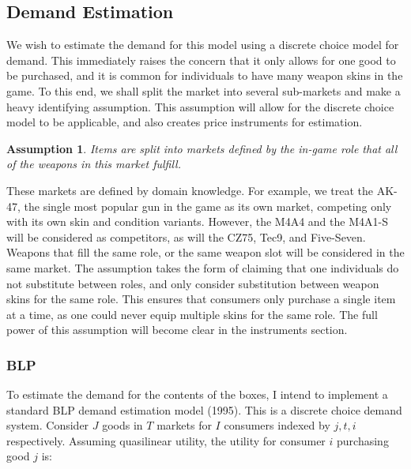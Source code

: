 \documentclass[12pt]{paper}
\newtheorem{assume}{Assumption}
\begin{document}

 \subsection{Demand Estimation}

We wish to estimate the demand for this model using a discrete choice
model for demand. This immediately raises the concern that it only
allows for one good to be purchased, and it is common for individuals
to have many weapon skins in the game. To this end, we shall split the
market into several sub-markets and make a heavy identifying
assumption. This assumption will allow for the discrete choice model
to be applicable, and also creates price instruments for estimation.

\begin{assume}
  Items are split into markets defined by the in-game role that all of
  the weapons in this market fulfill.
\end{assume}

These markets are defined by domain knowledge. For example, we treat
the AK-47, the single most popular gun in the game as its own market,
competing only with its own skin and condition variants. However, the
M4A4 and the M4A1-S will be considered as competitors, as will the
CZ75, Tec9, and Five-Seven. Weapons that fill the same role, or the
same weapon slot will be considered in the same market. The assumption
takes the form of claiming that one individuals do not substitute
between roles, and only consider substitution between weapon skins for
the same role. This ensures that consumers only purchase a single item
at a time, as one could never equip multiple skins for the same
role. The full power of this assumption will become clear in the
instruments section.

\subsubsection{BLP}

To estimate the demand for the contents of the boxes, I intend to
implement a standard BLP demand estimation model (1995). This is a discrete
choice demand system. Consider $J$ goods in $T$ markets for $I$
consumers indexed by $j,t,i$ respectively. Assuming quasilinear
utility, the utility for consumer $i$ purchasing good $j$ is:
\end{document}
